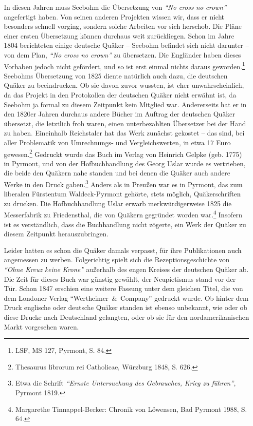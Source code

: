 In diesen Jahren muss Seebohm die Übersetzung von \textit{"`No cross no crown"'}
angefertigt haben. Von seinen anderen Projekten wissen wir, dass er nicht
besonders schnell vorging, sondern solche Arbeiten vor sich herschob. Die Pläne
einer ersten Übersetzung können durchaus weit zurückliegen. Schon im Jahre 1804
berichteten einige deutsche Quäker -- Seebohm befindet sich nicht darunter -- von
dem Plan, \textit{"`No cross no crown"'} zu übersetzen. Die Engländer haben dieses
Vorhaben jedoch nicht gefördert, und so ist erst einmal nichts daraus
geworden.\footnote{LSF, MS 127, Pyrmont, S. 84.} Seebohms Übersetzung von 1825
diente natürlich auch dazu, die deutschen Quäker zu beeindrucken. Ob sie davon
zuvor wussten, ist eher unwahrscheinlich, da das Projekt in den Protokollen der
deutschen Quäker nicht erwähnt ist, da Seebohm ja formal zu diesem Zeitpunkt
kein Mitglied war. Andererseits hat er in den 1820er Jahren durchaus andere
Bücher im Auftrag der deutschen Quäker übersetzt, die letztlich froh waren,
einen unterbezahlten Übersetzer bei der Hand zu haben. Eineinhalb Reichstaler
hat das Werk zunächst gekostet -- das sind, bei aller Problematik von
Umrechnungs- und Vergleichswerten, in etwa 17 Euro gewesen.\footnote{Thesaurus
librorum rei Catholicae, Würzburg 1848, S. 626.} Gedruckt wurde das Buch im
Verlag von Heinrich Gelpke (geb. 1775) in Pyrmont, und von der Hofbuchhandlung
des Georg Uslar wurde es vertrieben, die beide den Quäkern nahe standen und bei denen die
Quäker auch andere Werke in den Druck gaben.\footnote{Etwa die Schrift \textit{"`Ernste
Untersuchung des Gebrauches, Krieg zu führen"'},
Pyrmont 1819.} Anders als in Preußen war es in
Pyrmont, das zum liberalen Fürstentum Waldeck-Pyr\-mont gehörte, stets möglich,
Quäkerschriften zu drucken. Die Hofbuchhandlung Uslar erwarb merkwürdigerweise
1825 die Messerfabrik zu Friedensthal, die von Quäkern gegründet worden
war.\footnote{Margarethe Tinnappel-Becker: Chronik von Löwensen, Bad Pyrmont
1988, S. 64.} Insofern ist es verständlich, dass die Buchhandlung nicht zögerte,
ein Werk der Quäker zu diesem Zeitpunkt herauszubringen.

\medskip


Leider hatten es schon die Quäker damals verpasst, für ihre Publikationen auch
angemessen zu werben. Folgerichtig spielt sich die Rezeptionsgeschichte von
\textit{"`Ohne Kreuz keine Krone"'} außerhalb des engen Kreises der deutschen Quäker ab.
Die Zeit für dieses Buch war günstig gewählt, der Neupietismus  stand vor der
Tür. Schon 1847 erschien eine weitere Fassung unter dem gleichen Titel, die von
dem Londoner Verlag "`Wertheimer~\&~Company"' gedruckt wurde. Ob hinter dem
Druck englische oder deutsche Quäker standen ist ebenso unbekannt, wie oder ob
diese Drucke nach Deutschland gelangten, oder ob sie für den nordamerikanischen
Markt vorgesehen waren.

